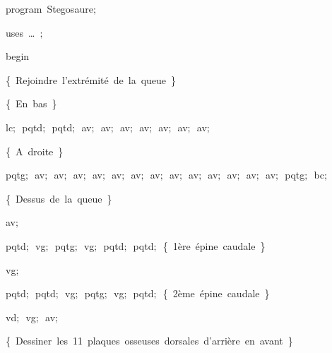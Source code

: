 
{
\parindent {}
\medskip

\carrenoir
\vspace{\neglskip}\mbox{\blc  \idt  \mcl program\idt \ Stegosaure$;$
}\par 
\vspace{\neglskip}\mbox{\blc \blk\idt \mcl uses\idt \ \ldots\ $;$
}\par 
\vspace{\neglskip}\mbox{\blc  \idt  \mcl begin\idt }\par 
\vspace{\neglskip}\mbox{\blc  \blk\idt  \cmt  \{\ Rejoindre\ l{'}extrémité\ de\ la\ queue\ \}\idt }\par 
\vspace{\neglskip}\mbox{\blc  \blk\blk\idt  \cmt  \{\ En\ bas\ \}\idt }\par 
\vspace{\neglskip}\mbox{\blc  \blk\blk\idt  lc$;$\ pqtd$;$\ pqtd$;$\ av$;$\ av$;$\ av$;$\ av$;$\ av$;$\ av$;$\ av$;$\ }\par 
\vspace{\neglskip}\mbox{\blc  \blk\blk\idt  \cmt  \{\ A\ droite\ \}\idt }\par 
\vspace{\neglskip}\mbox{\blc  \blk\blk\idt  pqtg$;$\ av$;$\ av$;$\ av$;$\ av$;$\ av$;$\ av$;$\ av$;$\ av$;$\ av$;$\ av$;$\ av$;$\ av$;$\ av$;$\ pqtg$;$\ bc$;$}\par 
\vspace{\neglskip}\mbox{\blc  \blk\idt  \cmt  \{\ Dessus\ de\ la\ queue\ \}\idt }\par 
\vspace{\neglskip}\mbox{\blc  \blk\blk\idt  av$;$}\par 
\vspace{\neglskip}\mbox{\blc  \blk\blk\idt  pqtd$;$\ vg$;$\ pqtg$;$\ vg$;$\ pqtd$;$\ pqtd$;$\ \cmt  \{\ 1ère\ épine\ caudale\ \}\idt }\par 
\vspace{\neglskip}\mbox{\blc  \blk\blk\idt  vg$;$}\par 
\vspace{\neglskip}\mbox{\blc  \blk\blk\idt  pqtd$;$\ pqtd$;$\ vg$;$\ pqtg$;$\ vg$;$\ pqtd$;$\ \cmt  \{\ 2ème\ épine\ caudale\ \}\idt }\par 
\vspace{\neglskip}\mbox{\blc  \blk\blk\idt  vd$;$\ vg$;$\ av$;$}\par 
\vspace{\neglskip}\mbox{\blc  \blk\idt  \cmt  \{\ Dessiner\ les\ 11\ plaques\ osseuses\ dorsales\ d{'}arrière\ en\ avant\ \}\idt }\par 
}
